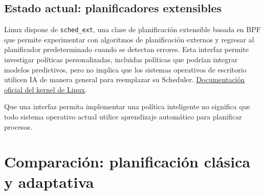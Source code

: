 \documentclass[
  spanish,
  letterpaper,
]{scrbook}
\begin{document}
\section{Estado actual: planificadores
extensibles}\label{estado-actual-planificadores-extensibles}

Linux dispone de \texttt{sched\_ext}, una clase de planificación
extensible basada en BPF que permite experimentar con algoritmos de
planificación externos y regresar al planificador predeterminado cuando
se detectan errores. Esta interfaz permite investigar políticas
personalizadas, incluidas políticas que podrían integrar modelos
predictivos, pero no implica que los sistemas operativos de escritorio
utilicen IA de manera general para reemplazar su Scheduler.
\href{https://docs.kernel.org/scheduler/sched-ext.html}{Documentación
oficial del kernel de Linux}.

\begin{tcolorbox}[enhanced jigsaw, arc=.35mm, bottomrule=.15mm, bottomtitle=1mm, breakable, colback=white, colbacktitle=quarto-callout-warning-color!10!white, colframe=quarto-callout-warning-color-frame, coltitle=black, left=2mm, leftrule=.75mm, opacityback=0, opacitybacktitle=0.6, rightrule=.15mm, title=\textcolor{quarto-callout-warning-color}{\faExclamationTriangle}\hspace{0.5em}{No confundir posibilidad con adopción}, titlerule=0mm, toprule=.15mm, toptitle=1mm]

Que una interfaz permita implementar una política inteligente no
significa que todo sistema operativo actual utilice aprendizaje
automático para planificar procesos.

\end{tcolorbox}


\chapter{Comparación: planificación clásica y
adaptativa}\label{comparaciuxf3n-planificaciuxf3n-cluxe1sica-y-adaptativa}
\end{document}

